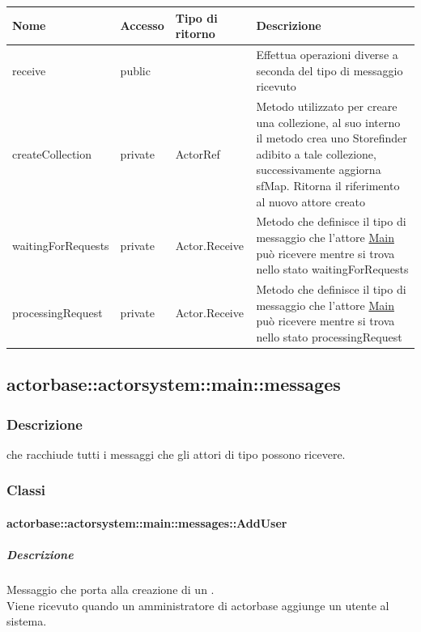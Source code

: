\documentclass{scalatekids-article}
\begin{document}
\begin{tabular}{| l | l | l | l |}
  \hline
  Nome & Accesso & Tipo di ritorno & Descrizione\\
  \hline
  receive & public &  & Effettua operazioni diverse a seconda del tipo di messaggio ricevuto\\
  \hline
  createCollection & private & ActorRef & Metodo utilizzato per creare una collezione, al suo interno il metodo crea uno Storefinder adibito a tale collezione, successivamente aggiorna sfMap. Ritorna il riferimento al nuovo attore creato\\
  \hline
  waitingForRequests & private & Actor.Receive & Metodo che definisce il tipo di messaggio che l'attore \hyperref[sec:actorbase::actorsystem::main::Main]{Main} può ricevere mentre si trova nello stato waitingForRequests\\
  \hline
  processingRequest & private & Actor.Receive & Metodo che definisce il tipo di messaggio che l'attore \hyperref[sec:actorbase::actorsystem::main::Main]{Main} può ricevere mentre si trova nello stato processingRequest\\
  \hline
\end{tabular}

\subsection{actorbase::actorsystem::main::messages}
\label{sec:actorbase::actorsystem::main::messages}

\subsubsection{Descrizione}
 che racchiude tutti i messaggi che gli attori di tipo
 possono ricevere.

\subsubsection{Classi}

\paragraph{actorbase::actorsystem::main::messages::AddUser}
\label{sec:actorbase::actorsystem::main::messages::AddUser}

\subparagraph{Descrizione}
Messaggio che porta alla creazione di un .\\Viene ricevuto
quando un amministratore di actorbase aggiunge un utente al sistema.
\end{document}
